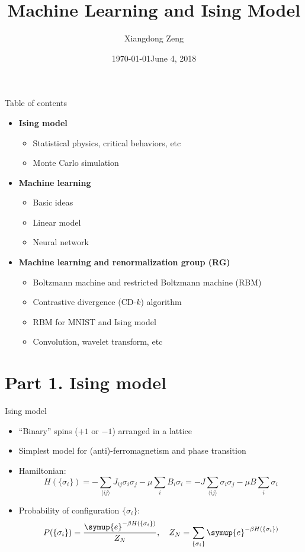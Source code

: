 \documentclass[aspectratio=169]{beamer}
\title{Machine Learning and Ising Model}
\date{\today}
\author{Xiangdong Zeng}
\institute{Department of Physics, Fudan University}
\date{June 4, 2018}
\def\ee{{\symup{e}}}
\def\nearest#1{\langle#1\rangle}
\def\q#1{{\{#1\}}}
\def\CDk{CD-$k$}
\begin{document}
\maketitle

\begin{frame}{Table of contents}
\begin{itemize}
  \item \textbf{Ising model}
    \begin{itemize}
      \item Statistical physics, critical behaviors, etc
      \item Monte Carlo simulation
    \end{itemize}
  \item \textbf{Machine learning}
    \begin{itemize}
      \item Basic ideas
      \item Linear model
      \item Neural network
    \end{itemize}
  \item \textbf{Machine learning and renormalization group (RG)}
    \begin{itemize}
      \item Boltzmann machine and restricted Boltzmann machine (RBM)
      \item Contrastive divergence (\CDk{}) algorithm
      \item RBM for MNIST and Ising model
      \item Convolution, wavelet transform, etc
    \end{itemize}
\end{itemize}
\end{frame}

\section{Part 1. Ising model}

\begin{frame}{Ising model}
\begin{itemize}
  \item ``Binary'' spins ($+1$ or $-1$) arranged in a lattice
  \item Simplest model for (anti)-ferromagnetism and phase transition
  \item Hamiltonian:
    \[
      H(\q{\sigma_i}) = -\sum_{\nearest{ij}} J_{ij}\sigma_i\sigma_j - \mu \sum_{i} B_i\sigma_i
                      = -J \sum_{\nearest{ij}} \sigma_i\sigma_j - \mu B \sum_{i} \sigma_i
    \]
  \item Probability of configuration $\q{\sigma_i}$:
    \[
      P(\q{\sigma_i}) = \frac{\ee^{-\beta H(\q{\sigma_i})}}{Z_N} \qc
      Z_N = \sum_\q{\sigma_i} \ee^{-\beta H(\q{\sigma_i})}
    \]
\end{itemize}
\end{frame}
\end{document}
